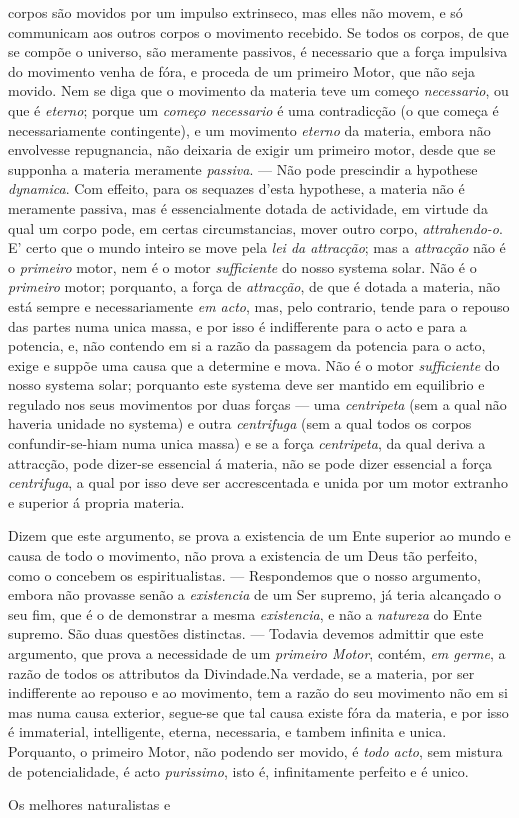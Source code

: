 corpos são movidos por um impulso extrinseco, mas elles não movem, e só communicam aos outros corpos o movimento recebido. Se todos os corpos, de que se compõe o universo, são meramente passivos, é necessario que a força impulsiva do movimento venha de fóra, e proceda de um primeiro Motor, que não seja movido. Nem se diga que o movimento da materia teve um começo \emph{necessario}, ou que é \emph{eterno}; porque um \emph{começo necessario} é uma contradicção (o que começa é necessariamente contingente), e um movimento \emph{eterno} da materia, embora não envolvesse repugnancia, não deixaria de exigir um primeiro motor, desde que se supponha a materia meramente \emph{passiva}. --- Não pode prescindir a hypothese \emph{dynamica}. Com effeito, para os sequazes d'esta hypothese, a materia não é meramente passiva, mas é essencialmente dotada de actividade, em virtude da qual um corpo pode, em certas circumstancias, mover outro corpo, \emph{attrahendo-o}. E' certo que o mundo inteiro se move pela \emph{lei da attracção}; mas a \emph{attracção} não é o \emph{primeiro} motor, nem é o motor \emph{sufficiente} do nosso systema solar. Não é o \emph{primeiro} motor; porquanto, a força de \emph{attracção}, de que é dotada a materia, não está sempre e necessariamente \emph{em acto}, mas, pelo contrario, tende para o repouso das partes numa unica massa, e por isso é indifferente para o acto e para a potencia, e, não contendo em si a razão da passagem da potencia para o acto, exige e suppõe uma causa que a determine e mova. Não é o motor \emph{sufficiente} do nosso systema solar; porquanto este systema deve ser mantido em equilibrio e regulado nos seus movimentos por duas forças --- uma \emph{centripeta} (sem a qual não haveria unidade no systema) e outra \emph{centrifuga} (sem a qual todos os corpos confundir-se-hiam numa unica massa) e se a força \emph{centripeta}, da qual deriva a attracção, pode dizer-se essencial á materia, não se pode dizer essencial a força \emph{centrifuga}, a qual por isso deve ser accrescentada e unida por um motor extranho e superior á propria materia.\par Dizem que este argumento, se prova a existencia de um Ente superior ao mundo e causa de todo o movimento, não prova a existencia de um Deus tão perfeito, como o concebem os espiritualistas. --- Respondemos que o nosso argumento, embora não provasse senão a \emph{existencia} de um Ser supremo, já teria alcançado o seu fim, que é o de demonstrar a mesma \emph{existencia}, e não a \emph{natureza} do Ente supremo. São duas questões distinctas. --- Todavia devemos admittir que este argumento, que prova a necessidade de um \emph{primeiro Motor}, contém, \emph{em germe}, a razão de todos os attributos da Divindade.Na verdade, se a materia, por ser indifferente ao repouso e ao movimento, tem a razão do seu movimento não em si mas numa causa exterior, segue-se que tal causa existe fóra da materia, e por isso é immaterial, intelligente, eterna, necessaria, e tambem infinita e unica. Porquanto, o primeiro Motor, não podendo ser movido, é \emph{todo acto}, sem mistura de potencialidade, é acto \emph{purissimo}, isto é, infinitamente perfeito e é unico.\par Os melhores naturalistas e 